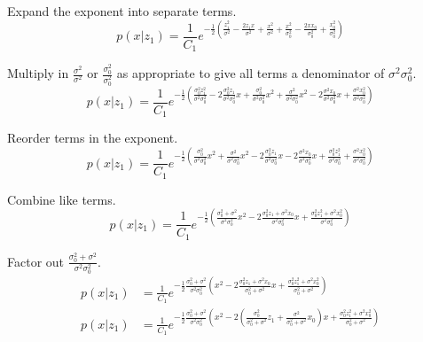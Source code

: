Expand the exponent into separate terms.
\begin{equation*}
  p(x|z_1) = \frac{1}{C_1} e^{-\frac{1}{2} \left(
      \frac{z_1^2}{\sigma^2} - \frac{2z_1 x}{\sigma^2} + \frac{x^2}{\sigma^2} +
      \frac{x^2}{\sigma_0^2} - \frac{2xx_0}{\sigma_0^2} + \frac{x_0^2}{\sigma_0^2}
    \right)}
\end{equation*}

Multiply in $\frac{\sigma^2}{\sigma^2}$ or $\frac{\sigma_0^2}{\sigma_0^2}$ as
appropriate to give all terms a denominator of $\sigma^2 \sigma_0^2$.
\begin{equation*}
  p(x|z_1) = \frac{1}{C_1} e^{-\frac{1}{2} \left(
      \frac{\sigma_0^2 z_1^2}{\sigma^2 \sigma_0^2}
      - 2\frac{\sigma_0^2 z_1}{\sigma^2 \sigma_0^2} x
      + \frac{\sigma_0^2}{\sigma^2 \sigma_0^2} x^2
      + \frac{\sigma^2}{\sigma^2 \sigma_0^2} x^2
      - 2\frac{\sigma^2 x_0}{\sigma^2 \sigma_0^2} x
      + \frac{\sigma^2 x_0^2}{\sigma^2 \sigma_0^2}
    \right)}
\end{equation*}

Reorder terms in the exponent.
\begin{equation*}
  p(x|z_1) = \frac{1}{C_1} e^{-\frac{1}{2} \left(
      \frac{\sigma_0^2}{\sigma^2 \sigma_0^2} x^2
      + \frac{\sigma^2}{\sigma^2 \sigma_0^2} x^2
      - 2\frac{\sigma_0^2 z_1}{\sigma^2 \sigma_0^2} x
      - 2\frac{\sigma^2 x_0}{\sigma^2 \sigma_0^2} x
      + \frac{\sigma_0^2 z_1^2}{\sigma^2 \sigma_0^2}
      + \frac{\sigma^2 x_0^2}{\sigma^2 \sigma_0^2}
    \right)}
\end{equation*}

Combine like terms.
\begin{equation*}
  p(x|z_1) = \frac{1}{C_1} e^{-\frac{1}{2} \left(
      \frac{\sigma_0^2 + \sigma^2}{\sigma^2\sigma_0^2} x^2 -
      2\frac{\sigma_0^2 z_1 + \sigma^2 x_0}{\sigma^2 \sigma_0^2} x +
      \frac{\sigma_0^2 z_1^2 + \sigma^2 x_0^2}{\sigma^2 \sigma_0^2}
    \right)}
\end{equation*}

Factor out $\frac{\sigma_0^2 + \sigma^2}{\sigma^2 \sigma_0^2}$.
\begin{align*}
  p(x|z_1) &= \frac{1}{C_1} e^{-\frac{1}{2}
    \frac{\sigma_0^2 + \sigma^2}{\sigma^2 \sigma_0^2} \left(
      x^2 - 2\frac{\sigma_0^2 z_1 + \sigma^2 x_0}{\sigma_0^2 + \sigma^2} x +
      \frac{\sigma_0^2 z_1^2 + \sigma^2 x_0^2}{\sigma_0^2 + \sigma^2}
    \right)} \\
  p(x|z_1) &= \frac{1}{C_1} e^{-\frac{1}{2}
    \frac{\sigma_0^2 + \sigma^2}{\sigma^2 \sigma_0^2} \left(
      x^2 - 2\left(
        \frac{\sigma_0^2}{\sigma_0^2 + \sigma^2} z_1 +
        \frac{\sigma^2}{\sigma_0^2 + \sigma^2} x_0
      \right) x +
      \frac{\sigma_0^2 z_1^2 + \sigma^2 x_0^2}{\sigma_0^2 + \sigma^2}
    \right)}
\end{align*}

